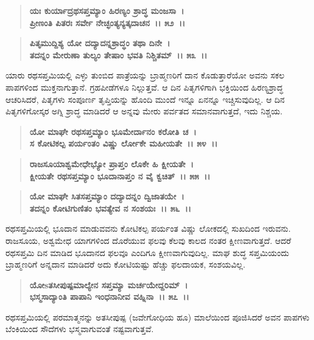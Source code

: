 \begin{verse}
\textbf{ಯಃ ಕುರ್ಯಾದ್ರಥಸಪ್ತಮ್ಯಾಂ ಹಿರಣ್ಯಂ ಶ್ರಾದ್ಧ ಮಂಜಸಾ~।}\\\textbf{ಪ್ರೀಣಂತಿ ಪಿತರಃ ಸರ್ವೇ ನೇಚ್ಛಂತ್ಯನ್ಯತ್ಕದಾಚನ~।। ೫೨~।।} 
\end{verse}

\begin{verse}
\textbf{ಪಿತೃಮುದ್ದಿಶ್ಯ ಯೋ ದದ್ಯಾದನ್ನಶ್ರಾದ್ಧಂ ತಥಾ ದಿನೇ~।}\\\textbf{ತದನ್ನಂ ಮೇರುಣಾ ತುಲ್ಯಂ ತೇಷಾಂ ಭವತಿ ನಿಶ್ಚಿತಮ್~।। ೫೩~।।}
\end{verse}

ಯಾರು ರಥಸಪ್ತಮಿಯಲ್ಲಿ ಎಳ್ಳು ತುಂಬಿದ ಪಾತ್ರೆಯನ್ನು ಬ್ರಾಹ್ಮಣರಿಗೆ ದಾನ ಕೊಡುತ್ತಾ\-ರೆಯೋ ಅವನು ಸಕಲ ಪಾಪಗಳಿಂದ ಮುಕ್ತನಾಗುತ್ತಾನೆ. ಗ್ರಹಪೀಡೆಗಳೂ ನಿಲ್ಲುತ್ತವೆ. ಆ ದಿನ ಪಿತೃಗಳಿಗಾಗಿ ಭಕ್ತಿಯಿಂದ ಹಿರಣ್ಯಶ್ರಾದ್ಧ ಆಚರಿಸಿದರೆ, ಪಿತೃಗಳು ಸಂಪೂರ್ಣ ತೃಪ್ತಿಯನ್ನು ಹೊಂದಿ ಮುಂದೆ ಇನ್ನೂ ಏನನ್ನೂ ಇಚ್ಚಿಸುವುದಿಲ್ಲ. ಆ ದಿನ ಪಿತೃಗಳಿಗೋಸ್ಕರ ಅಗ್ನಿ ಶ್ರಾದ್ಧ ಮಾಡಿದರೆ ಆ ಅನ್ನವು ಮೇರು ಪರ್ವತದ ಸಮಾನವಾಗುತ್ತದೆ, ಇದು ನಿಶ್ಚಯ.

\begin{verse}
\textbf{ಯೋ ಮಾಘೇ ರಥಸಪ್ತಮ್ಯಾಂ ಭೂಮೇರ್ದಾನಂ ಕರೋತಿ ಚ~।}\\\textbf{ಸ ಕೋಟಿಕಲ್ಪ ಪರ್ಯಂತಂ ವಿಷ್ಣು ರ್ಲೋಕೇ ಮಹೀಯತೇ~।। ೫೪~।।}
\end{verse}

\begin{verse}
\textbf{ರಾಜಸೂಯಾಶ್ವಮೇಧೇಭ್ಯೋ ಪ್ರಾಪ್ತಂ ಲೊಕೇ ಹಿ ಕ್ಷೀಯತೇ~।}\\\textbf{ಕ್ಷೀಯತೇ ರಥಸಪ್ತಮ್ಯಾಂ ಭೂದಾನಾಪ್ತಂ ನ ವೈ ಕ್ವಚಿತ್~।। ೫೫~।। }
\end{verse}

\begin{verse}
\textbf{ಯೋ ಮಾಘೇ ಸಿತಸಪ್ತಮ್ಯಾಂ ದದ್ಯಾದನ್ನಂ ದ್ವಿಜಾತಯೇ~।}\\\textbf{ತದನ್ನಂ ಕೋಟಿಗುಣಿತಂ ಭವತ್ಯೇವ ನ ಸಂಶಯಃ~।। ೫೬~।।}
\end{verse}

ರಥಸಪ್ತಮಿಯಲ್ಲಿ ಭೂದಾನ ಮಾಡುವವನು ಕೋಟಿಕಲ್ಪ ಪರ್ಯಂತ ವಿಷ್ಣು ಲೋಕದಲ್ಲಿ ಸುಖದಿಂದ ಇರುವನು. ರಾಜಸೂಯ, ಅಶ್ವಮೇಧ ಯಾಗಗಳಿಂದ ದೊರೆಯುವ ಫಲವು ಕೆಲವು ಕಾಲದ ನಂತರ ಕ್ಷೀಣವಾಗುತ್ತದೆ. ಆದರೆ ರಥಸಪ್ತಮಿ ದಿನ ಮಾಡಿದ ಭೂದಾನದ ಫಲವೂ ಎಂದಿಗೂ ಕ್ಷೀಣವಾಗುವುದಿಲ್ಲ. ಮಾಘ ಶುದ್ಧ ಸಪ್ತಮಿಯಂದು ಬ್ರಾಹ್ಮಣರಿಗೆ ಅನ್ನದಾನ ಮಾಡಿದರೆ ಅದು ಕೋಟಿಯಷ್ಟು ಹೆಚ್ಚು ಫಲದಾಯಕ, ಸಂಶಯವಿಲ್ಲ.

\begin{verse}
\textbf{ಯೋsತಸೀಪುಷ್ಪಮಾಲ್ಯೇನ ಸಪ್ತಮ್ಯಾ ಮರ್ಚಯೇದ್ದರಿಮ್~।}\\\textbf{ಭಸ್ಮಸಾದ್ಯಾಂತಿ ಪಾಪಾನಿ ಇಂಧನಾನೀವ ವಹ್ನಿನಾ~।। ೫೭~।।}
\end{verse}

ರಥಸಪ್ತಮಿಯಲ್ಲಿ ಪರಮಾತ್ಮನನ್ನು ಅತಸೀಪುಷ್ಪ (ಜವೇಗೋಧಿಯ ಹೂ) ಮಾಲೆಯಿಂದ ಪೂಜಿಸಿದರೆ ಅವನ ಪಾಪಗಳು ಬೆಂಕಿಯಿಂದ ಸೌದೆಗಳು ಭಸ್ಮವಾಗುವಂತೆ ನಷ್ಟವಾಗುತ್ತವೆ.

